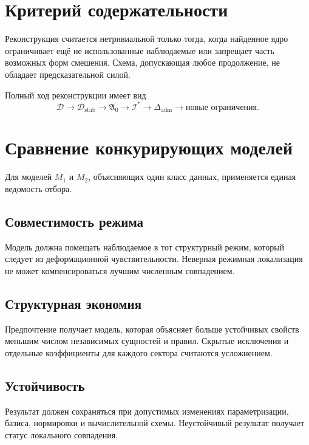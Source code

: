 \chapter{Критерий содержательности}

Реконструкция считается нетривиальной только тогда, когда найденное ядро
ограничивает ещё не использованные наблюдаемые или запрещает часть возможных
форм смешения. Схема, допускающая любое продолжение, не обладает
предсказательной силой.

Полный ход реконструкции имеет вид
\begin{equation}
 \mathcal D\longrightarrow\mathcal D_{\mathrm{stab}}
 \longrightarrow\mathfrak A_0
 \longrightarrow\mathcal I^*
 \longrightarrow\Delta_{\mathrm{adm}}
 \longrightarrow\text{новые ограничения}.
\end{equation}

\chapter{Сравнение конкурирующих моделей}

Для моделей $M_1$ и $M_2$, объясняющих один класс данных, применяется единая
ведомость отбора.

\section{Совместимость режима}

Модель должна помещать наблюдаемое в тот структурный режим, который следует
из деформационной чувствительности. Неверная режимная локализация не может
компенсироваться лучшим численным совпадением.

\section{Структурная экономия}

Предпочтение получает модель, которая объясняет больше устойчивых свойств
меньшим числом независимых сущностей и правил. Скрытые исключения и отдельные
коэффициенты для каждого сектора считаются усложнением.

\section{Устойчивость}

Результат должен сохраняться при допустимых изменениях параметризации,
базиса, нормировки и вычислительной схемы. Неустойчивый результат получает
статус локального совпадения.

